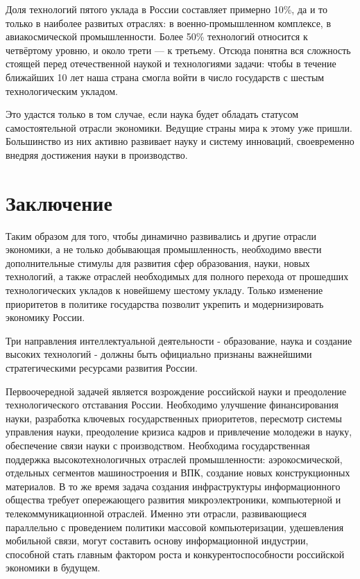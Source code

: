 \documentclass[a4paper,12pt]{article}
\begin{document}
Доля технологий пятого уклада в России составляет примерно 10\%, да и
то только в наиболее развитых отраслях: в военно-промышленном комплексе, в
авиакосмической промышленности. Более 50\% технологий относится к четвёртому
уровню, и около трети — к третьему. Отсюда понятна вся сложность стоящей
перед отечественной наукой и технологиями задачи: чтобы в течение ближайших 10 лет 
наша страна смогла войти в число государств с шестым технологическим укладом.

Это удастся только в том случае, если наука будет обладать
статусом самостоятельной отрасли экономики. Ведущие страны мира к этому уже пришли.  
Большинство из них активно развивает науку и систему
инноваций, своевременно внедряя достижения науки в производство.
\cite{SixthTechn}

\section{Заключение}

Таким образом для того, чтобы динамично развивались и другие отрасли экономики,
а не только добывающая промышленность, необходимо ввести дополнительные
стимулы для развития сфер образования, науки, новых технологий, а также отраслей
необходимых для полного перехода от прошедших технологических укладов к новейшему шестому укладу. 
Только изменение приоритетов в политике государства позволит укрепить и
модернизировать экономику России.

Три направления интеллектуальной деятельности - образование, наука и создание
высоких технологий - должны быть официально признаны важнейшими стратегическими
ресурсами развития России.

Первоочередной задачей является возрождение российской науки\cite{Yavlinsky} и
преодоление технологического отставания России. Необходимо улучшение
финансирования науки, разработка ключевых государственных приоритетов, 
пересмотр системы управления науки, преодоление кризиса кадров и привлечение
молодежи в науку, обеспечение связи науки с производством. Необходима
государственная поддержка высокотехнологичных отраслей промышленности:
аэрокосмической, отдельных сегментов машиностроения и ВПК, создание новых
конструкционных материалов. В то же время задача создания инфраструктуры
информационного общества требует опережающего развития микроэлектроники,
компьютерной и телекоммуникационной отраслей. Именно эти отрасли, развивающиеся
параллельно с проведением политики массовой компьютеризации, удешевления
мобильной связи, могут составить основу информационной индустрии, способной
стать главным фактором роста и конкурентоспособности российской экономики в будущем.


{}   %
\end{document}
